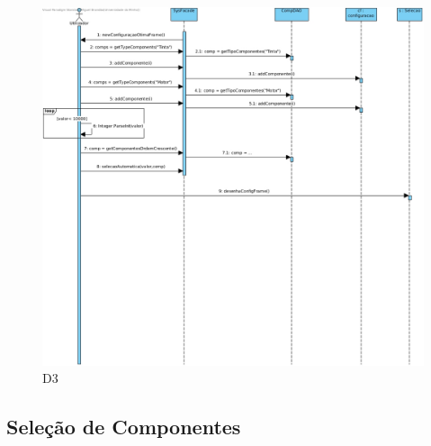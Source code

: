 \begin{figure}[H]
    \centering
    \includegraphics[width=\textwidth]{diagramas_de_sequencia/imgs/UserSystemUC10D3.jpg}
    \caption{D3}
\end{figure}

\subsection{Seleção de Componentes}


